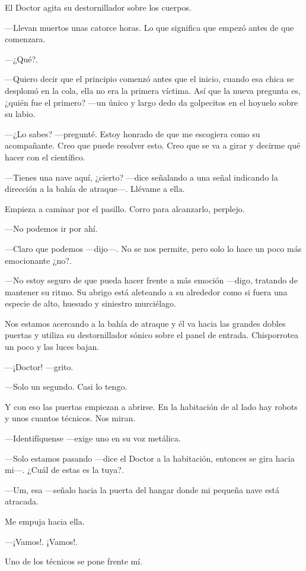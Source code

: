 El Doctor agita su destornillador sobre los cuerpos. 

---Llevan muertos unas catorce horas. Lo que significa que empezó antes
de que comenzara.

---¿Qué?.

---Quiero decir que el principio comenzó antes que el inicio, cuando esa
chica se desplomó en la cola, ella no era la primera víctima. Así que la
nueva pregunta es, ¿quién fue el primero? ---un único y largo dedo da
golpecitos en el hoyuelo sobre su labio.

---¿Lo sabes? ---pregunté. Estoy honrado de que me escogiera como su
acompañante. Creo que puede resolver esto. Creo que se va a girar y
decirme qué hacer con el científico.

---Tienes una nave aquí, ¿cierto? ---dice señalando a una señal
indicando la dirección a la bahía de atraque---. Llévame a ella.

Empieza a caminar por el pasillo. Corro para alcanzarlo, perplejo. 

---No podemos ir por ahí.

---Claro que podemos ---dijo---. No se nos permite, pero solo lo hace un
poco más emocionante ¿no?.

---No estoy seguro de que pueda hacer frente a más emoción ---digo,
tratando de mantener su ritmo. Su abrigo está aleteando a su alrededor
como si fuera una especie de alto, huesudo y siniestro murciélago.

Nos estamos acercando a la bahía de atraque y él va hacia las grandes
dobles puertas y utiliza su destornillador sónico sobre el panel de
entrada. Chisporrotea un poco y las luces bajan.

---¡Doctor! ---grito.

---Solo un segundo. Casi lo tengo.

Y con eso las puertas empiezan a abrirse. En la habitación de al lado
hay robots y unos cuantos técnicos. Nos miran.

---Identifíquense ---exige uno en su voz metálica.

---Solo estamos pasando ---dice el Doctor a la habitación, entonces se
gira hacia mi---. ¿Cuál de estas es la tuya?.

---Um, esa ---señalo hacia la puerta del hangar donde mi pequeña nave
está atracada.

Me empuja hacia ella.

---¡Vamos!. ¡Vamos!.

Uno de los técnicos se pone frente mí.

